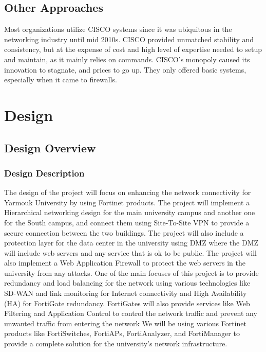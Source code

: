 \documentclass[12pt]{report}
\begin{document}
\section{Other Approaches}
Most organizations utilize CISCO systems since it was ubiquitous in the networking industry until mid 2010s. CISCO provided unmatched stability and consistency, but at the expense of cost and high level of expertise needed to setup and maintain, as it mainly relies on commands. CISCO's monopoly caused its innovation to stagnate, and prices to go up. They only offered basic systems, especially when it came to firewalls.\cite{FNvsCISCO} \cite{CISCOInntoFin}


\chapter{Design}

\section{Design Overview}
\subsection{Design Description}
The design of the project will focus on enhancing the network connectivity for Yarmouk University by using Fortinet products. The project will implement a Hierarchical networking design for the main university campus and another one for the South campus, and connect them using Site-To-Site VPN to provide a secure connection between the two buildings. The project will also include a protection layer for the data center in the university using DMZ where the DMZ will include web servers and any service that is ok to be public. The project will also implement a Web Application Firewall to protect the web servers in the university from any attacks. One of the main focuses of this project is to provide redundancy and load balancing for the network using various technologies like SD-WAN and link monitoring for Internet connectivity and High Availability (HA) for FortiGate redundancy. FortiGates will also provide services like Web Filtering and Application Control to control the network traffic and prevent any unwanted traffic from entering the network We will be using various Fortinet products like FortiSwitches, FortiAPs, FortiAnalyzer, and FortiManager to provide a complete solution for the university's network infrastructure.
\end{document}
